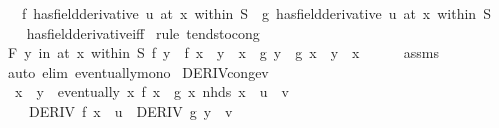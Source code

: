 \begin{isabellebody}
\ \ \ {\isachardoublequoteopen}{\isacharparenleft}{\kern0pt}f\ has{\isacharunderscore}{\kern0pt}field{\isacharunderscore}{\kern0pt}derivative\ u{\isacharparenright}{\kern0pt}\ {\isacharparenleft}{\kern0pt}at\ x\ within\ S{\isacharparenright}{\kern0pt}\ {\isacharequal}{\kern0pt}\ {\isacharparenleft}{\kern0pt}g\ has{\isacharunderscore}{\kern0pt}field{\isacharunderscore}{\kern0pt}derivative\ u{\isacharparenright}{\kern0pt}\ {\isacharparenleft}{\kern0pt}at\ x\ within\ S{\isacharparenright}{\kern0pt}{\isachardoublequoteclose}\isanewline
%
\isadelimproof
\ \ %
\endisadelimproof
%
\isatagproof
{}\isamarkupfalse%
\ has{\isacharunderscore}{\kern0pt}field{\isacharunderscore}{\kern0pt}derivative{\isacharunderscore}{\kern0pt}iff\isanewline
{}\isamarkupfalse%
\ {\isacharparenleft}{\kern0pt}rule\ tendsto{\isacharunderscore}{\kern0pt}cong{\isacharparenright}{\kern0pt}\isanewline
\ \ \isamarkupfalse%
\ {\isachardoublequoteopen}{\isasymforall}\isactrlsub F\ y\ in\ at\ x\ within\ S{\isachardot}{\kern0pt}\ {\isacharparenleft}{\kern0pt}f\ y\ {\isacharminus}{\kern0pt}\ f\ x{\isacharparenright}{\kern0pt}\ {\isacharslash}{\kern0pt}\ {\isacharparenleft}{\kern0pt}y\ {\isacharminus}{\kern0pt}\ x{\isacharparenright}{\kern0pt}\ {\isacharequal}{\kern0pt}\ {\isacharparenleft}{\kern0pt}g\ y\ {\isacharminus}{\kern0pt}\ g\ x{\isacharparenright}{\kern0pt}\ {\isacharslash}{\kern0pt}\ {\isacharparenleft}{\kern0pt}y\ {\isacharminus}{\kern0pt}\ x{\isacharparenright}{\kern0pt}{\isachardoublequoteclose}\isanewline
\ \ \ \ \isamarkupfalse%
\ assms\ \isamarkupfalse%
\ {\isacharparenleft}{\kern0pt}auto\ elim{\isacharcolon}{\kern0pt}\ eventually{\isacharunderscore}{\kern0pt}mono{\isacharparenright}{\kern0pt}\isanewline
{}\isamarkupfalse%
%
\endisatagproof
{\isafoldproof}%
%
\isadelimproof
\isanewline
%
\endisadelimproof
\isanewline
{}\isamarkupfalse%
\ DERIV{\isacharunderscore}{\kern0pt}cong{\isacharunderscore}{\kern0pt}ev{\isacharcolon}{\kern0pt}\isanewline
\ \ {\isachardoublequoteopen}x\ {\isacharequal}{\kern0pt}\ y\ {\isasymLongrightarrow}\ eventually\ {\isacharparenleft}{\kern0pt}{\isasymlambda}x{\isachardot}{\kern0pt}\ f\ x\ {\isacharequal}{\kern0pt}\ g\ x{\isacharparenright}{\kern0pt}\ {\isacharparenleft}{\kern0pt}nhds\ x{\isacharparenright}{\kern0pt}\ {\isasymLongrightarrow}\ u\ {\isacharequal}{\kern0pt}\ v\ {\isasymLongrightarrow}\isanewline
\ \ \ \ DERIV\ f\ x\ {\isacharcolon}{\kern0pt}{\isachargreater}{\kern0pt}\ u\ {\isasymlongleftrightarrow}\ DERIV\ g\ y\ {\isacharcolon}{\kern0pt}{\isachargreater}{\kern0pt}\ v{\isachardoublequoteclose}\isanewline

\end{isabellebody}

